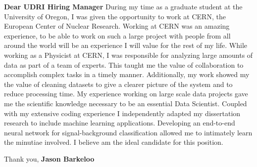 \documentclass[a4paper]{article}
\title{}
\author{Jason T. Barkeloo}
\date{\today}
\begin{document}
\fontsize{12}{15}
\selectfont
\maketitle


\textbf{Dear UDRI Hiring Manager}\newline\newline
\newline\newline
During my time as a graduate student at the University of Oregon, I was given the opportunity to work at CERN, the European Center of Nuclear Research. Working at CERN was an amazing experience, to be able to work on such a large project with people from all around the world will be an experience I will value for the rest of my life.\newline\newline
While working as a Physicist at CERN, I was responsible for analyzing large amounts of data as part of a team of experts. This taught me the value of collaboration to accomplish complex tasks in a timely manner. Additionally, my work showed my the value of cleaning datasets to give a clearer picture of the system and to reduce processing time.\newline\newline
My experience working on large scale data projects gave me the scientific knowledge necessary to be an essential Data Scientist. Coupled with my extensive coding experience I independently adapted my dissertation research to include machine learning applications.  Developing an end-to-end neural network for signal-background classification allowed me to intimately learn the minutiae involved.  I believe am the ideal candidate for this position.\newline\newline

Thank you,
\newline
\textbf{Jason Barkeloo}
\end{document}
